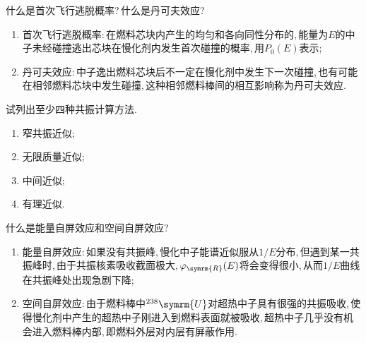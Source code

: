 \begin{exercise}
    什么是首次飞行逃脱概率?\,什么是丹可夫效应?\,
    \begin{solution}
        \begin{enumerate}[(1)]
            \item 首次飞行逃脱概率:\,在燃料芯块内产生的均匀和各向同性分布的,\,能量为$E$的中子未经碰撞逃出芯块在慢化剂内发生首次碰撞的概率,\,用$P_0(E)$表示;\,
            \item 丹可夫效应:\,中子逸出燃料芯块后不一定在慢化剂中发生下一次碰撞,\,也有可能在相邻燃料芯块中发生碰撞,\,这种相邻燃料棒间的相互影响称为丹可夫效应.\,
        \end{enumerate}
    \end{solution}
\end{exercise}

\begin{exercise}
    试列出至少四种共振计算方法.\,
    \begin{solution}
        \begin{enumerate}[(1)]
            \item 窄共振近似;
            \item 无限质量近似;
            \item 中间近似;
            \item 有理近似.
        \end{enumerate}
    \end{solution}
\end{exercise}

\begin{exercise}
    什么是能量自屏效应和空间自屏效应?\,
    \begin{solution}
        \begin{enumerate}[(1)]
            \item 能量自屏效应:\,如果没有共振峰,\,慢化中子能谱近似服从$1/E$分布,\,但遇到某一共振峰时,\,由于共振核素吸收截面极大,\,$\varphi_{\symrm{R}}(E)$将会变得很小,\,从而$1/E$曲线在共振峰处出现急剧下降;\,
            \item 空间自屏效应:\,由于燃料棒中${}^{238}\symrm{U}$对超热中子具有很强的共振吸收,\,使得慢化剂中产生的超热中子刚进入到燃料表面就被吸收,\,超热中子几乎没有机会进入燃料棒内部,\,即燃料外层对内层有屏蔽作用.\,
        \end{enumerate}
    \end{solution}
\end{exercise}

